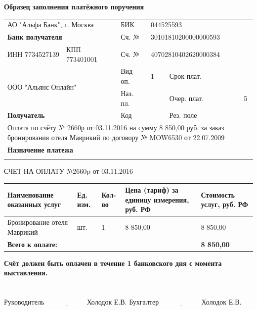 \documentclass[a4paper,10pt]{article}
\begin{document}
\begin{center}
\textbf {Образец заполнения платёжного поручения}

\begin{tabular}{p{100pt}|p{100pt}|p{35pt}|p{50pt}|p{50pt}|p{65pt}}
\hline
\multicolumn{2}{p{150pt}|}{АО "Альфа Банк", г. Москва} &БИК & \multicolumn{3}{p{150pt}}{044525593} \\
\cline{3-6}
\multicolumn{2}{p{150pt}|}{\textbf {Банк получателя}} & Сч. № & \multicolumn{2}{p{150pt}}{30101810200000000593} \\
\hline
ИНН 7734527139 & КПП 773401001 &  Сч. № & \multicolumn{2}{p{150pt}}{40702810402620000384} \\
\hline
\multicolumn{2}{p{150pt}|}{\multirow{2}{150pt}{ООО "Альянс Онлайн"}} & Вид оп. & 1 & Срок плат. & \\
\cline{3-6}
\multicolumn{2}{p{150pt}|}{} & Наз. пл. & & Очер. плат. & 5 \\
\cline{3-6}
\multicolumn{2}{p{150pt}|}{\textbf{Получатель}}   & Код & & Рез. поле & \\
\hline
\hline
\multicolumn{6}{p{450pt}}{Оплата по счёту № 2660р от 03.11.2016 на сумму 8 850,00 руб. за заказ бронирования отеля Маврикий по договору № MOW6530 от 22.07.2009} \\
\multicolumn{6}{p{450pt}}{\textbf{Назначение платежа}}  \\
\hline
\multicolumn{6}{p{450pt}}{} \\
\end{tabular}

\Large {СЧЕТ НА ОПЛАТУ №2660p от 03.11.2016}
\small

\begin{longtable}{|p{200pt}|p{25pt}|p{25pt}|p{110pt}|p{85pt}|}

\hline 
Наименование оказанных услуг & Ед. изм. & Кол-во &Цена (тариф) за единицу измерения, руб. РФ & Стоимость услуг, руб. РФ \\
\hline
Бронирование отеля Маврикий & шт. & 1 & 8 850,00 & 8 850,00 \\
\hline
\multicolumn{4}{|p{200pt}|}{\textbf{Всего к оплате:}} & \textbf{8 850,00} \\
\hline
\end{longtable}
\end{center}

\textbf {Счёт должен быть оплачен в течение 1 банковского дня с момента выставления.}
\\
\\
\\

Руководитель \hspace{10pt} $\underset{\text{}}{\underline{\hspace{70pt}}}$Холодок Е.В.\hspace{20pt}  Бухгалтер \hspace{10pt} $\underset{\text{}}{\underline{\hspace{70pt}}}$Холодок Е.В.
\end{document}

